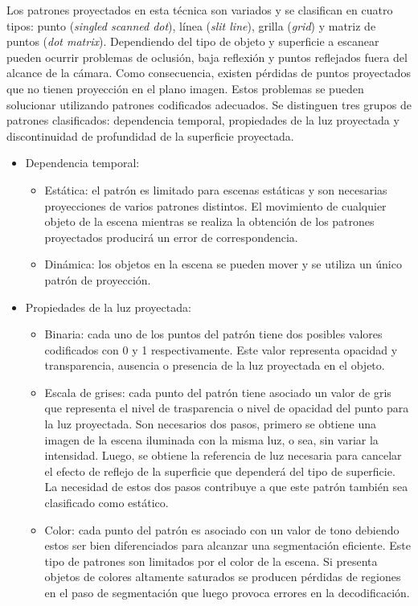 Los patrones proyectados en esta técnica son variados y se clasifican en cuatro tipos: punto (\emph{singled scanned dot}), línea (\emph{slit line}), grilla (\emph{grid}) y matriz de puntos (\emph{dot matrix}).
Dependiendo del tipo de objeto y superficie a escanear pueden ocurrir problemas de oclusión, baja reflexión y puntos reflejados fuera del alcance de la cámara. Como consecuencia, existen pérdidas de puntos proyectados que no tienen proyección en el plano imagen.
Estos problemas se pueden solucionar utilizando patrones codificados adecuados. Se distinguen tres grupos de patrones clasificados: dependencia temporal, propiedades de la luz proyectada y discontinuidad de profundidad de la superficie proyectada\cite{SLightCorrespondence}.
\begin{itemize}
   \item Dependencia  temporal:
   \begin{itemize}
	\item Estática: el patrón es limitado para escenas estáticas y son necesarias proyecciones de varios patrones distintos. El movimiento de cualquier objeto de la escena mientras se realiza la obtención de los patrones proyectados producirá un error de correspondencia.
	\item Dinámica: los objetos en la escena se pueden mover y se utiliza un único patrón de proyección.
   \end{itemize}
   \item Propiedades de la luz proyectada:
   \begin{itemize}
	\item Binaria: cada uno de los puntos del patrón tiene dos posibles valores codificados con 0 y 1 respectivamente. Este valor representa opacidad y transparencia, ausencia o presencia de la luz proyectada en el objeto.
	\item Escala de grises: cada punto del patrón tiene asociado un valor de gris que representa el nivel de trasparencia o nivel de opacidad del punto para la luz proyectada. Son necesarios dos pasos, primero se obtiene una imagen de la escena iluminada con la misma luz, o sea, sin variar la intensidad. Luego, se obtiene la referencia de luz necesaria para cancelar el efecto de reflejo de la superficie que dependerá del tipo de superficie. La necesidad de estos dos pasos contribuye a que este patrón también sea clasificado como estático.
	\item Color: cada punto del patrón es asociado con un valor de tono debiendo estos ser bien diferenciados para alcanzar una segmentación eficiente. Este tipo de patrones son limitados por el color de la escena. Si presenta objetos de colores altamente saturados se producen pérdidas de regiones en el paso de segmentación que luego provoca errores en la decodificación.

\end{itemize}
\end{itemize}
